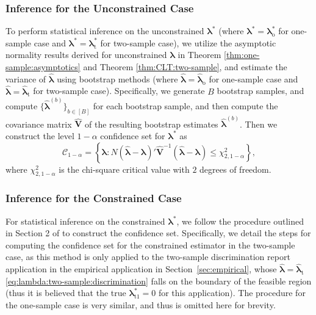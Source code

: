 \documentclass[12pt,letterpaper]{article}
\begin{document}
\subsubsection{Inference for the Unconstrained Case}\label{subsub:inference:unconstrained}
To perform statistical inference on the unconstrained $\boldsymbol{\lambda}^*$ (where $\boldsymbol{\lambda}^*=\boldsymbol{\lambda}_{\mathrm{o}}^*$ for one-sample case and $\boldsymbol{\lambda}^*=\boldsymbol{\lambda}_{\mathrm{t}}^*$ for two-sample case), we utilize the asymptotic normality results derived for unconstrained $\boldsymbol{\lambda}$ in Theorem \ref{thm:one-sample:asymptotics} and Theorem \ref{thm:CLT:two-sample},  and estimate the variance of $\hat{\boldsymbol{\lambda}}$ using bootstrap methods (where $\hat{\boldsymbol{\lambda}}=\hat{\boldsymbol{\lambda}}_{\mathrm{o}}$ for one-sample case and $\hat{\boldsymbol{\lambda}}=\hat{\boldsymbol{\lambda}}_{\mathrm{t}}$ for two-sample case). Specifically, we generate $B$ bootstrap samples, and compute $\{\hat{\boldsymbol{\lambda}}^{(b)}\}_{b\in[B]}$ for each bootstrap sample, and then compute the covariance matrix $\hat{\boldsymbol{V}}$ of the resulting bootstrap estimates $\hat{\boldsymbol{\lambda}}^{(b)}$. Then we construct the level $1-\alpha$ confidence set for $\boldsymbol{\lambda}^*$ as 
\begin{equation}\label{eq:confidence:set:one-sample}
    \mathcal{C}_{1-\alpha} = \left\{\boldsymbol{\lambda}: N(\hat{\boldsymbol{\lambda}}-\boldsymbol{\lambda})'\hat{\boldsymbol{V}}^{-1}(\hat{\boldsymbol{\lambda}}-\boldsymbol{\lambda})\leq\chi_{2,1-\alpha}^2\right\},
\end{equation}
where $\chi_{2,1-\alpha}^2$ is the chi-square critical value with $2$ degrees of freedom. 

\subsubsection{Inference for the Constrained Case}\label{subsub:inference:constrained}
For statistical inference on the constrained $\boldsymbol{\lambda}^*$, we follow the procedure outlined in Section 2 of \citet{li2024inference} to construct the confidence set. Specifically, we detail the steps for computing the confidence set for the constrained estimator in the two-sample case, as this method is only applied to the two-sample discrimination report application in the empirical application in Section~\ref{sec:empirical}, whose $\hat{\boldsymbol{\lambda}}=\hat{\boldsymbol{\lambda}}_{\mathrm{t}}$ \eqref{eq:lambda:two-sample:discrimination} falls on the boundary of the feasible region (thus it is believed that the true $\boldsymbol{\lambda}_{\mathrm{t}1}^*=0$ for this application). 
The procedure for the one-sample case is very similar, and thus is omitted here for brevity.
\end{document}
